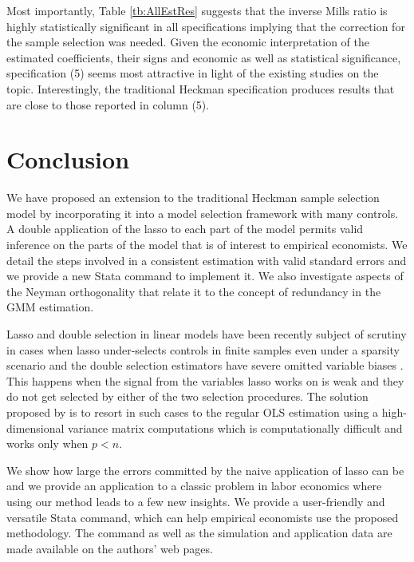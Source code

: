 \documentclass[11pt]{article}
\begin{document}
Most importantly, Table \ref{tb:AllEstRes} suggests that the
inverse Mills ratio is highly statistically significant in all specifications implying that the correction for the sample selection
was needed. %
Given %
the economic
interpretation of the estimated coefficients, their signs and economic as well as statistical significance, specification (5) seems most attractive %
in light of the existing studies on
the topic. Interestingly, the traditional Heckman specification produces %
results that %
are close to those reported in column (5).


\section{Conclusion}	\label{sec:conclude}
We have proposed an extension to the traditional Heckman sample selection model by incorporating it into a model selection framework with many controls. A double application of the lasso to each part of the model permits valid inference on the parts of the model that is of interest to empirical economists. We detail the steps involved in a consistent estimation with valid standard errors and we provide a new Stata command to implement it. We also investigate aspects of the Neyman orthogonality that relate it to the concept of redundancy in the GMM estimation. 

Lasso and double selection in linear models have been recently subject of scrutiny in cases when lasso under-selects controls in finite samples even under a sparsity scenario and the double selection estimators have severe omitted variable biases \cite[see, e.g.,][]{wuthrich/zhu:21, lahiri:21}. This happens when the signal from the variables lasso works on is weak and they do not get selected by either of the two selection procedures. The solution proposed by \cite{wuthrich/zhu:21} is to resort in such cases to the regular OLS estimation using a high-dimensional variance matrix computations which is computationally difficult and works only when $p<n$.  

We show how large the errors committed by the naive application of lasso can be and we provide an application to a classic problem in labor economics where using our method leads to a few new insights. We provide a user-friendly and versatile Stata command, which can help empirical economists use the proposed methodology. The command as well as the simulation and application data are made available on the authors' web pages.
\end{document}
